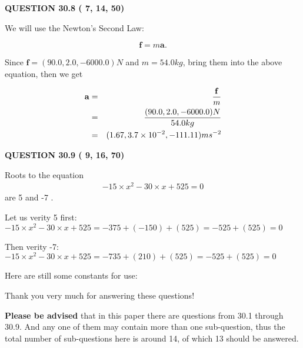 \documentclass[12pt]{article}
\begin{document}
{\textbf{\Large{QUESTION
30.8 
 (          7,         14,         50)
}}}
  
  
 
 

We will use the Newton's Second Law:
 
\[
\mathbf{f}=m\mathbf{a}.
\]
 
Since $\mathbf{f}= %
(90.0 , 2.0 , -6000.0) N$
and $m= %
54.0kg$, bring them into the above equation, then we get
 
\begin{eqnarray*}
\mathbf{a}&=&\frac{\mathbf{f}}m  \\
&=&\frac{ %
(90.0 , 2.0 , -6000.0) N}{ %
54.0kg}  \\
&=& %
(1.67 , 3.7 \times 10^{-2} , -111.11) ms^{-2}
\end{eqnarray*}
 
 
 
  
\vspace{0.2in}
  
{\textbf{\Large{QUESTION
30.9 
 (          9,         16,         70)
}}}
  
  


 
 

Roots to the equation
\begin{eqnarray*}
-15 \times x^2  %
-30
                 \times x    %
+  %
525 =0
\end{eqnarray*}
are  %
5 and  %
-7 .
 
Let us verity  %
5 first:
$  %
-15 \times x^2  %
-30
                 \times x    %
+  %
525
  = %
-375+( %
-150)+( %
525)
  = %
-525+( %
525)
  = %
0
$
 
Then verity  %
-7:
$  %
-15 \times x^2  %
-30
                 \times x    %
+  %
525
  = %
-735+( %
210)+( %
525)
  = %
-525+( %
525)
  = %
0
$
 
 
 
   
   
 \vspace{0.2in}
Here are still some constants for use:
 
 
 
 
Thank you very much for answering these questions!
 
{\textbf{\large{Please be advised}}} that in this paper there are questions from
30.1 through
30.9.
And any one of them may contain more than one sub-question, thus the total number
of sub-questions here is around 14, of which
13 should be answered.
 
\end{document}
